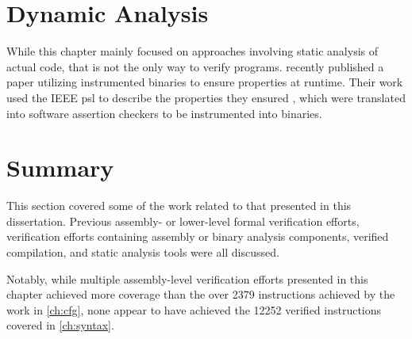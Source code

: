 \section{Dynamic Analysis}\label{se:dynamic}
While this chapter mainly focused on approaches involving static analysis of actual code,
that is not the only way to verify programs.
\Textcite{brignon2019abv} recently published a paper
utilizing instrumented binaries to ensure properties at runtime.
Their work used the IEEE \ac{psl}
to describe the properties they ensured \autocite{ieee:psl},
which were translated into software assertion checkers to be instrumented into binaries.

\section{Summary}
This section covered some of the work related to that presented in this dissertation.
Previous assembly- or lower-level formal verification efforts,
verification efforts containing assembly or binary analysis components,
verified compilation, and static analysis tools were all discussed.

Notably, while multiple assembly-level verification efforts
presented in this chapter achieved more coverage
than the over \num{2379} instructions achieved by the work in \cref{ch:cfg},
none appear to have achieved the \num{12252}
verified instructions covered in \cref{ch:syntax}.
